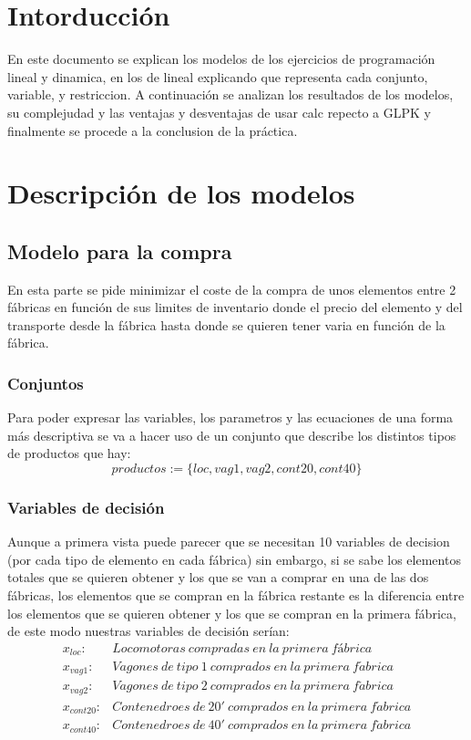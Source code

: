 \documentclass[11pt,spanish]{article}
\begin{document}


	\section{Intorducción}
	En este documento se explican los modelos de los ejercicios de programación lineal y dinamica, en los de lineal explicando que representa cada conjunto, variable, y restriccion. A continuación se analizan los resultados de los modelos, su complejudad y las ventajas y desventajas de usar calc repecto a GLPK y finalmente se procede a la conclusion de la práctica.

	\section{Descripción de los modelos}
		\subsection{Modelo para la compra}
			En esta parte se pide minimizar el coste de la compra de unos elementos entre 2 fábricas en función de sus limites de inventario donde el precio del elemento y del transporte desde la fábrica hasta donde se quieren tener varia en función de la fábrica.
			\subsubsection{Conjuntos}
			Para poder expresar las variables, los parametros y las ecuaciones de una forma más descriptiva se va a hacer uso de un conjunto que describe los distintos tipos de productos que hay:
			$$ productos := \{loc, vag1, vag2, cont20, cont40\} $$
			\subsubsection{Variables de decisión}
			Aunque a primera vista puede parecer que se necesitan 10 variables de decision (por cada tipo de elemento en cada fábrica) sin embargo, si se sabe los elementos totales que se quieren obtener y los que se van a comprar en una de las dos fábricas, los elementos que se compran en la fábrica restante es la diferencia entre los elementos que se quieren obtener y los que se compran en la primera fábrica, de este modo nuestras variables de decisión serían:
			\begin{align*}
			x_{loc}:& Locomotoras\ compradas\ en\ la\ primera\ fábrica \\
			x_{vag1}:& Vagones\ de\ tipo\ 1\ comprados\ en\ la\ primera\ f\acute{a}brica \\
			x_{vag2}:& Vagones\ de\ tipo\ 2\ comprados\ en\ la\ primera\ f\acute{a}brica \\
			x_{cont20}:& Contenedroes\ de\ 20'\ comprados\ en\ la\ primera\ f\acute{a}brica \\
			x_{cont40}:& Contenedroes\ de\ 40'\ comprados\ en\ la\ primera\ f\acute{a}brica 
			\end{align*}
			
\end{document}
